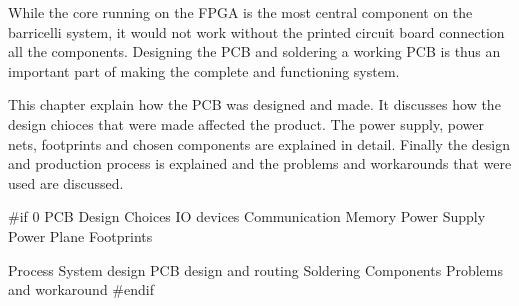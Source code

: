 
While the core running on the FPGA is the most central component on the barricelli system, it would not work without the printed circuit board connection all the components.
Designing the PCB and soldering a working PCB is thus an important part of making the complete and functioning system.

This chapter explain how the PCB was designed and made.
It discusses how the design chioces that were made affected the product.
The power supply, power nets, footprints and chosen components are explained in detail.
Finally the design and production process is explained and the problems and workarounds that were used are discussed.

 \label{pcb:section:design_choices}

 \label{pcb:section:power_supply}

 \label{pcb:section:power_plane}

 \label{pcb:section:footprints}

 \label{pcb:section:process}

 \label{pcb:section:components}

 \label{pcb:section:problems_and_workaround}

#if 0
PCB
    Design Choices
        IO devices
        Communication
        Memory
    Power Supply
    Power Plane
    Footprints
        
    Process
        System design
        PCB design and routing
        Soldering
    Components
    Problems and workaround
#endif
